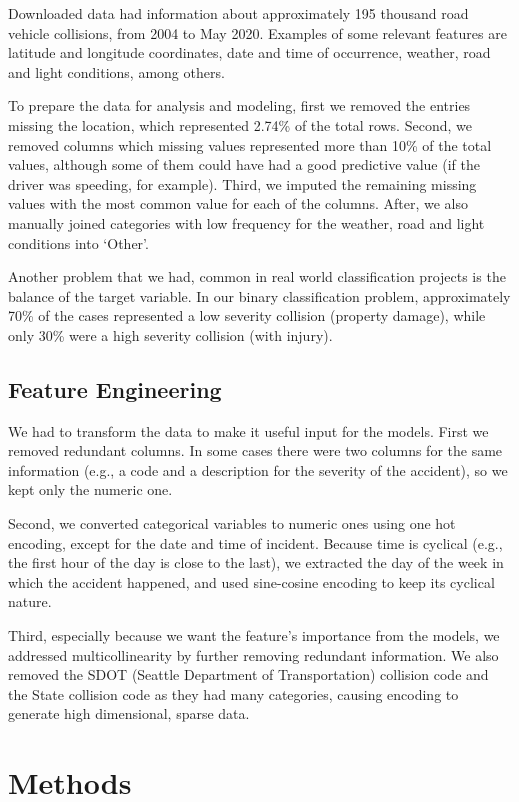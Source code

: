 \documentclass[12pt]{article}
\begin{document}
Downloaded data had information about approximately 195 thousand road vehicle collisions, from 2004 to May 2020. Examples of some relevant features are latitude and longitude coordinates, date and time of occurrence, weather, road and light conditions, among others.

To prepare the data for analysis and modeling, first we removed the entries missing the location, which represented 2.74\% of the total rows.
Second, we removed columns which missing values represented more than 10\% of the total values, although some of them could have had a good predictive value  (if the driver was speeding, for example).
Third, we imputed the remaining missing values with the most common value for each of the columns. After, we also manually joined categories with low frequency for the weather, road and light conditions into `Other'.

Another problem that we had, common in real world classification projects is the balance of the target variable. In our binary classification problem, approximately 70\% of the cases represented a low severity collision (property damage), while only 30\% were a high severity collision (with injury).

\subsection{Feature Engineering}

We had to transform the data to make it useful input for the models. First we removed redundant columns. In some cases there were two columns for the same information (e.g., a code and a description for the severity of the accident), so we kept only the numeric one.

Second, we converted categorical variables to numeric ones using one hot encoding, except for the date and time of incident. Because time is cyclical (e.g., the first hour of the day is close to the last), we extracted the day of the week in which the accident happened, and used sine-cosine encoding to keep its cyclical nature.

Third, especially because we want the feature's importance from the models, we addressed multicollinearity by further removing redundant information. We also removed the SDOT (Seattle Department of Transportation) collision code and the State collision code as they had many categories, causing encoding to generate high dimensional, sparse data.

\section{Methods}
\end{document}
